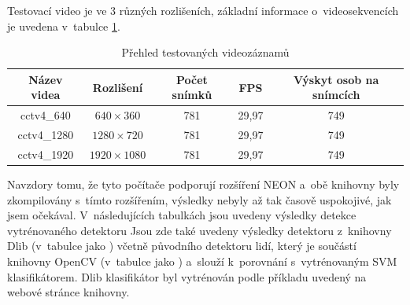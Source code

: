 Testovací video \cite{testvideo} je ve 3 různých rozlišeních, základní informace o~videosekvencích je uvedena v~tabulce \ref{videosTab}.

\begin{table}[H]
\centering
\caption{Přehled testovaných videozáznamů}
\begin{tabular} { |c|c|c|c|c| }
\hline
{Název videa}   & {Rozlišení} 	     &  {Počet snímků} & {FPS} & {Výskyt osob na snímcích} \\ \hline
cctv4\_640 	 &  $640\times360$	     &      781	   & 29,97 & 	      749			    \\ \hline
cctv4\_1280	 & $1280\times720$       &      781	   & 29,97 & 	      749			    \\ \hline
cctv4\_1920 	 & $1920\times1080$	     &      781	   & 29,97 & 	      749			    \\ \hline
\end{tabular}
\label{videosTab}
\end{table}
Navzdory tomu, že tyto počítače podporují rozšíření NEON a~obě knihovny byly zkompilovány s~tímto rozšířením, výsledky nebyly až tak časově uspokojivé, jak jsem očekával. V~následujících tabulkách jsou uvedeny výsledky detekce vytrénovaného detektoru Jsou zde také uvedeny výsledky detektoru z~knihovny Dlib (v~tabulce jako ) včetně původního detektoru lidí, který je součástí knihovny OpenCV (v~tabulce jako ) a~slouží k~porovnání s~vytrénovaným SVM klasifikátorem. Dlib klasifikátor byl vytrénován podle příkladu uvedený na webové stránce knihovny. 

